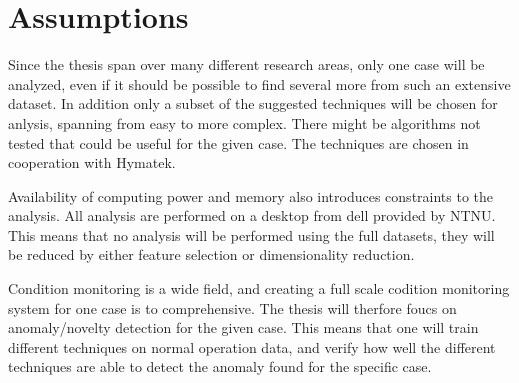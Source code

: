     
    
    

\section{Assumptions}\label{sec:assumptions}
    Since the thesis span over many different research areas, only one case will be analyzed, even if it should be possible to find several more from such an extensive dataset. In addition only a subset of the suggested techniques will be chosen for anlysis, spanning from easy to more complex. There might be algorithms not tested that could be useful for the given case. The techniques are chosen in cooperation with Hymatek. 
    
    Availability of computing power and memory also introduces constraints to the analysis. All analysis are performed on a desktop from dell provided by NTNU. This means that no analysis will be performed using the full datasets, they will be reduced by either feature selection or dimensionality reduction. 
    
    Condition monitoring is a wide field, and creating a full scale codition monitoring system for one case is to comprehensive. The thesis will therfore foucs on anomaly/novelty detection for the given case. This means that one will train different techniques on normal operation data, and verify how well the different techniques are able to detect the anomaly found for the specific case. 
    
